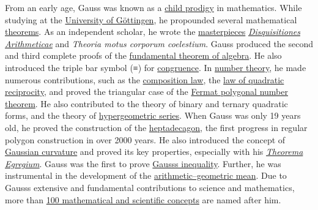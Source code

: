 From an early age, Gauss was known as a \href{https://en.wikipedia.org/wiki/Child_prodigy}{child prodigy} in mathematics. While studying at the \href{https://en.wikipedia.org/wiki/University_of_Göttingen}{University of Göttingen}, he propounded several mathematical \href{https://en.wikipedia.org/wiki/Theorem}{theorems}. As an independent scholar, he wrote the \href{https://en.wikipedia.org/wiki/Masterpiece}{masterpieces} \emph{\href{https://en.wikipedia.org/wiki/Disquisitiones_Arithmeticae}{Disquisitiones Arithmeticae}} and \emph{Theoria motus corporum coelestium}. Gauss produced the second and third complete proofs of the \href{https://en.wikipedia.org/wiki/Fundamental_theorem_of_algebra}{fundamental theorem of algebra}. He also introduced the triple bar symbol (≡) for \href{https://en.wikipedia.org/wiki/Congruence_relation}{congruence}. In \href{https://en.wikipedia.org/wiki/Number_theory}{number theory}, he made numerous contributions, such as the \href{https://en.wikipedia.org/wiki/Gauss_composition_law}{composition law}, the \href{https://en.wikipedia.org/wiki/Quadratic_reciprocity}{law of quadratic reciprocity}, and proved the triangular case of the \href{https://en.wikipedia.org/wiki/Fermat_polygonal_number_theorem}{Fermat polygonal number theorem}. He also contributed to the theory of binary and ternary quadratic forms, and the theory of \href{https://en.wikipedia.org/wiki/Hypergeometric_function}{hypergeometric series}. When Gauss was only 19 years old, he proved the construction of the \href{https://en.wikipedia.org/wiki/Heptadecagon}{heptadecagon}, the first progress in regular polygon construction in over 2000 years. He also introduced the concept of \href{https://en.wikipedia.org/wiki/Gaussian_curvature}{Gaussian curvature} and proved its key properties, especially with his \emph{\href{https://en.wikipedia.org/wiki/Theorema_Egregium}{Theorema Egregium}}. Gauss was the first to prove \href{https://en.wikipedia.org/wiki/Gauss's_inequality}{Gauss\textquotesingle s inequality}. Further, he was instrumental in the development of the \href{https://en.wikipedia.org/wiki/Arithmetic–geometric_mean}{arithmetic--geometric mean}. Due to Gauss\textquotesingle s extensive and fundamental contributions to science and mathematics, more than \href{https://en.wikipedia.org/wiki/List_of_things_named_after_Carl_Friedrich_Gauss}{100 mathematical and scientific concepts} are named after him.

